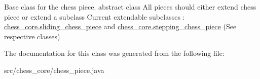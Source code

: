 Base class for the chess piece. abstract class All pieces should either extend chess piece or extend a subclass Current extendable subclasses \+: \hyperlink{classchess__core_1_1sliding__chess__piece}{chess\+\_\+core.\+sliding\+\_\+chess\+\_\+piece} and \hyperlink{classchess__core_1_1stepping__chess__piece}{chess\+\_\+core.\+stepping\+\_\+chess\+\_\+piece} (See respective classes) 

The documentation for this class was generated from the following file\+:\begin{DoxyCompactItemize}
\item 
src/chess\+\_\+core/chess\+\_\+piece.\+java\end{DoxyCompactItemize}
